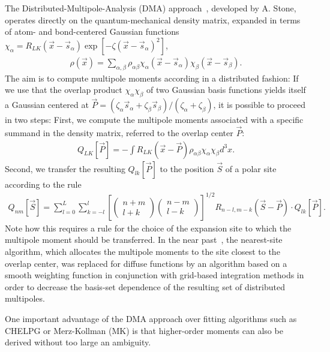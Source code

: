 The Distributed-Multipole-Analysis (DMA) approach~\cite{stone_distributed_1985, stone_distributed_2005}, developed by A. Stone, operates directly on the quantum-mechanical density matrix, expanded in terms of atom- and bond-centered Gaussian functions $\chi_\alpha = R_{LK}(\vec{x}-\vec{s}_\alpha) \exp[-\zeta(\vec{x}-\vec{s}_\alpha)^2]$,
\begin{align}
 \rho(\vec{x}) = \sum_{\alpha,\beta} \rho_{\alpha\beta} \chi_\alpha(\vec{x}-\vec{s}_\alpha) \chi_\beta(\vec{x}-\vec{s}_\beta). 
\end{align}
The aim is to compute multipole moments according in a distributed fashion: If we use that the overlap product $\chi_\alpha \chi_\beta$ of two Gaussian basis functions yields itself a Gaussian centered at $\vec{P} = (\zeta_\alpha \vec{s}_\alpha + \zeta_\beta \vec{s}_\beta) / (\zeta_\alpha + \zeta_\beta)$, it is possible to proceed in two steps: First, we compute the multipole moments associated with a specific summand in the density matrix, referred to the overlap center $\vec{P}$:
\begin{align}
 Q_{LK}[\vec{P}] = - \int R_{LK}(\vec{x}-\vec{P}) \rho_{\alpha\beta} \chi_\alpha \chi_\beta d^3\!x.
\end{align}
Second, we transfer the resulting $Q_{lk}[\vec{P}]$ to the position $\vec{S}$ of a polar site according to the rule~\cite{stone_distributed_1985}
\begin{align}
 Q_{nm}[\vec{S}] = \sum_{l=0}^L \sum_{k=-l}^l \left[ \left(\begin{array}{c} n+m \\ l+k \end{array}\right)\left(\begin{array}{c} n-m \\ l-k \end{array}\right) \right]^{1/2} R_{n-l,m-k}(\vec{S}-\vec{P})\cdot Q_{lk}[\vec{P}].
\end{align}
Note how this requires a rule for the choice of the expansion site to which the multipole moment should be transferred. In the near past~\cite{stone_distributed_2005}, the nearest-site algorithm, which allocates the multipole moments to the site closest to the overlap center, was replaced for diffuse functions by an algorithm based on a smooth weighting function in conjunction with grid-based integration methods in order to decrease the basis-set dependence of the resulting set of distributed multipoles.

One important advantage of the DMA approach over fitting algorithms such as CHELPG or Merz-Kollman (MK) is that higher-order moments can also be derived without too large an ambiguity.


